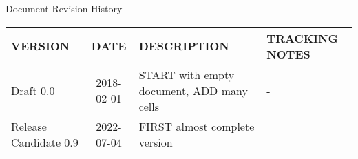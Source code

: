 Document Revision History
\begin{table}[h] %
    \begin{tabular}{|l|c|ll|} \hline
        VERSION & DATE & DESCRIPTION & TRACKING NOTES\\ \hline\hline
        Draft 0.0 & 2018-02-01 & START with empty document, ADD many cells & -\\ \hline
        Release Candidate 0.9 & 2022-07-04 & FIRST almost complete version & -\\ \hline
    \end{tabular}
\end{table}


